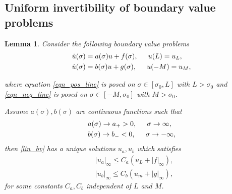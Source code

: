 \documentclass[letterpaper,11pt]{article}
\numberwithin{equation}{section}
\theoremstyle{plain}
\newtheorem{lemma}[theorem]{Lemma}
\begin{document}
\subsection{Uniform invertibility of boundary value problems }
\begin{lemma}\label{pert_inv}
Consider the following boundary value problems 
\begin{subequations}
\label{lin_bv}
\begin{align}
       &\dot{u}(\sigma) = a(\sigma) u + f(\sigma), \hspace{0.2in} u(L)= u_L,         \label{eqn_pos_line}  \\
              &\dot{u}(\sigma) = b(\sigma) u + g(\sigma), \hspace{0.2in} u(-M)= u_M,         \label{eqn_neg_line}
\end{align}
\end{subequations}

where equation \eqref{eqn_pos_line} is posed on $\sigma \in [\sigma_0,L]$ with $L>\sigma_0$ and \eqref{eqn_neg_line} is posed on $\sigma \in [-M,\sigma_0]$ with $M>\sigma_0$. 

Assume $a(\sigma), b(\sigma)$ are continuous functions such that 
\begin{subequations}
\label{ode_asy}
\begin{align}
       &a(\sigma) \to a_+>0, \hspace{0.2in} \sigma \to \infty      ,  \label{ode_asy_a}  \\
       &b(\sigma) \to b_- < 0, \hspace{0.2in} \sigma \to -\infty,         \label{ode_asy_b}
\end{align}
\end{subequations}
then \eqref{lin_bv} has a unique solutions $u_a,u_b$ which satisfies
\begin{subequations}
\label{ode_est}
\begin{align}
       &|u_a|_\infty \le C_a(u_L+|f|_\infty),  \label{ode_est_a}  \\
       &|u_b|_\infty \le C_b(u_m+|g|_\infty),         \label{ode_est_b}
\end{align}
\end{subequations}
for some constants $C_a, C_b$ independent of $L$ and $M$.
\end{lemma}
\end{document}
